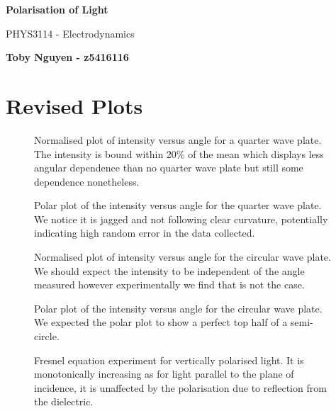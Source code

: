 \documentclass{article}
\begin{document}
\begin{titlepage}
    \begin{center}
        \vspace*{7cm}

        \Huge
        \textbf{Polarisation of Light}

        \vspace{0.5cm}
        \LARGE
        PHYS3114 - Electrodynamics

        \vspace{1.5cm}

        \textbf{Toby Nguyen - z5416116}
    \end{center}
\end{titlepage}

\tableofcontents

\section{Revised Plots}
\begin{figure} [H]
    \centering
    \scalebox{0.75}{}
    \caption{Normalised plot of intensity versus angle for a quarter 
    wave plate. The intensity is bound within 20\% of the mean which 
    displays less angular dependence than no quarter wave plate but 
    still some dependence nonetheless. }
\end{figure}
\begin{figure} [H]
    \centering
    \scalebox{0.75}{}
    \caption{Polar plot of the intensity versus angle for the quarter 
    wave plate. We notice it is jagged and not following clear 
    curvature, potentially indicating high random error in the data 
    collected.}
\end{figure}
\begin{figure} [H]
    \centering
    \scalebox{0.75}{}
    \caption{Normalised plot of intensity versus angle for the circular 
    wave plate. We should expect the intensity to be independent of the 
    angle measured however experimentally we find that is not the case.}
\end{figure}
\begin{figure} [H]
    \centering
    \scalebox{0.75}{}
    \caption{Polar plot of the intensity versus angle for the circular 
    wave plate. We expected the polar plot to show a perfect top half of 
    a semi-circle.}
\end{figure}
\begin{figure} [H]
    \centering
    \scalebox{0.75}{}
    \caption{Fresnel equation experiment for vertically polarised light. 
    It is monotonically increasing as for light parallel to the plane 
    of incidence, it is unaffected by the polarisation due to reflection 
    from the dielectric.}
\end{figure}
\end{document}

